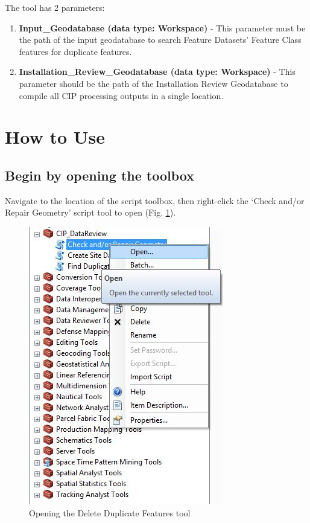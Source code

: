\documentclass[openany]{book}
\providecommand{\tightlist}{%
  \setlength{\itemsep}{0pt}\setlength{\parskip}{0pt}}
\theoremstyle{definition}
\theoremstyle{definition}
\theoremstyle{definition}
\theoremstyle{remark}
\begin{document}
The tool has 2 parameters:

\begin{enumerate}
\def\labelenumi{\arabic{enumi}.}
\tightlist
\item
  \textbf{Input\_Geodatabase (data type: Workspace)} - This parameter
  must be the path of the input geodatabase to search Feature Datasets'
  Feature Class features for duplicate features.\\
\item
  \textbf{Installation\_Review\_Geodatabase (data type: Workspace)} -
  This parameter should be the path of the Installation Review
  Geodatabase to compile all CIP processing outputs in a single
  location.
\end{enumerate}

\section{How to Use}\label{how-to-use-5}

\subsection{Begin by opening the
toolbox}\label{begin-by-opening-the-toolbox-5}

Navigate to the location of the script toolbox, then right-click the
`Check and/or Repair Geometry' script tool to open (Fig.
\ref{fig:chkGopen}).

\begin{figure}[H]

{\centering \includegraphics{figures/chkG-open} 

}

\caption{Opening the Delete Duplicate Features tool}\label{fig:chkGopen}
\end{figure}
\end{document}
